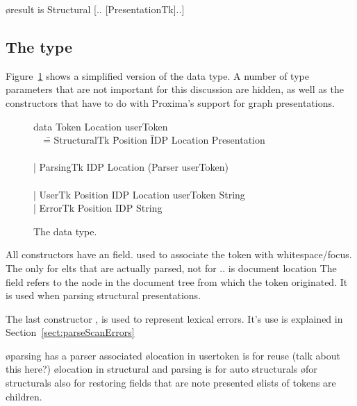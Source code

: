 \documentclass[12pt]{article}
\begin{document}
\bl
\o result is Structural [.. [PresentationTk]..]
\el

\subsection{The  type}

Figure~\ref{fig:tokenType} shows a simplified version of the  data type. A number of type parameters that are not important for this discussion are hidden, as well as the constructors that have to do with Proxima's support for graph presentations. 
\begin{figure}
\begin{center}
\begin{tabbedCode}
data Token Location userToken\\ 
~~\= =  StructuralTk \= Position \= IDP Location Presentation \\
  \>                \\
  \> | ParsingTk    \>          \> IDP Location (Parser userToken)\\
  \>                \\
  \> | UserTk       \> Position IDP Location userToken String \\
  \> | ErrorTk      \> Position IDP String \\
\end{tabbedCode}
\caption{The  data type.} \label{fig:tokenType} 
\end{center}
\end{figure}

All constructors have an  field. used to associate the token with whitespace/focus. The  only for elts that are actually parsed, not for ..   is document location
The  field refers to the node in the document tree from which the token originated. It is used when parsing structural presentations.

The last constructor , is used to represent lexical errors. It's use is explained in Section~\ref{sect:parseScanErrors}

\bl
\o parsing has a parser associated
\o location in usertoken is for reuse (talk about this here?)
\o location in structural and parsing is for auto structurals
\o for structurals also for restoring fields that are note presented
\o lists of tokens are children.
\el
\end{document}
